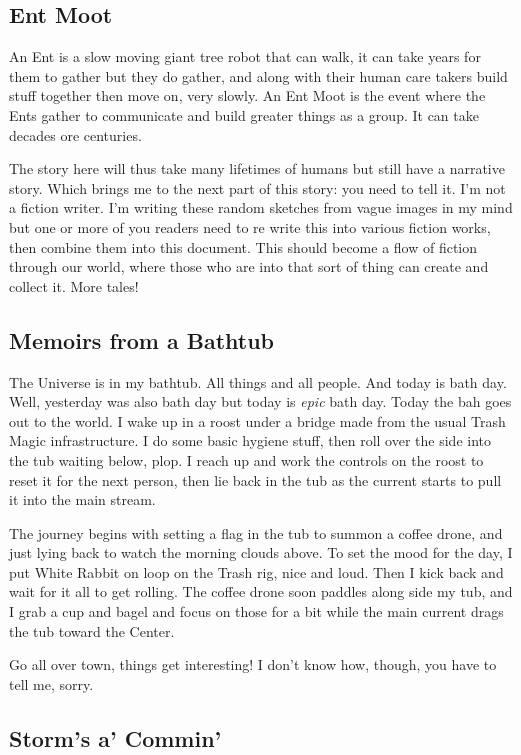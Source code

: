 \subsection{Ent Moot}\label{ent-moot}

An Ent is a slow moving giant tree robot that can walk, it can take
years for them to gather but they do gather, and along with their human
care takers build stuff together then move on, very slowly. An Ent Moot
is the event where the Ents gather to communicate and build greater
things as a group. It can take decades ore centuries.

The story here will thus take many lifetimes of humans but still have a
narrative story. Which brings me to the next part of this story: you
need to tell it. I'm not a fiction writer. I'm writing these random
sketches from vague images in my mind but one or more of you readers
need to re write this into various fiction works, then combine them into
this document. This should become a flow of fiction through our world,
where those who are into that sort of thing can create and collect it.
More tales!

\subsection{Memoirs from a Bathtub}\label{memoirs-from-a-bathtub}

The Universe is in my bathtub. All things and all people. And today is
bath day. Well, yesterday was also bath day but today is \emph{epic}
bath day. Today the bah goes out to the world. I wake up in a roost
under a bridge made from the usual Trash Magic infrastructure. I do some
basic hygiene stuff, then roll over the side into the tub waiting below,
plop. I reach up and work the controls on the roost to reset it for the
next person, then lie back in the tub as the current starts to pull it
into the main stream.

The journey begins with setting a flag in the tub to summon a coffee
drone, and just lying back to watch the morning clouds above. To set the
mood for the day, I put White Rabbit on loop on the Trash rig, nice and
loud. Then I kick back and wait for it all to get rolling. The coffee
drone soon paddles along side my tub, and I grab a cup and bagel and
focus on those for a bit while the main current drags the tub toward the
Center.

Go all over town, things get interesting! I don't know how, though, you
have to tell me, sorry.

\subsection{Storm's a' Commin'}\label{storms-a-commin}

